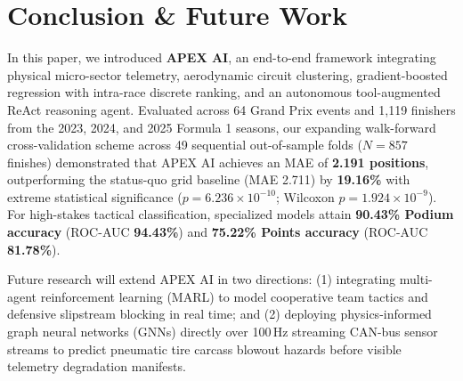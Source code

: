 \documentclass[journal]{IEEEtran}
\begin{document}
\section{Conclusion \& Future Work}
\label{sec:conclusion}
In this paper, we introduced \textbf{APEX AI}, an end-to-end framework integrating physical micro-sector telemetry, aerodynamic circuit clustering, gradient-boosted regression with intra-race discrete ranking, and an autonomous tool-augmented ReAct reasoning agent. Evaluated across 64 Grand Prix events and 1,119 finishers from the 2023, 2024, and 2025 Formula 1 seasons, our expanding walk-forward cross-validation scheme across 49 sequential out-of-sample folds ($N = 857$ finishes) demonstrated that APEX AI achieves an MAE of \textbf{2.191 positions}, outperforming the status-quo grid baseline (MAE 2.711) by \textbf{19.16\%} with extreme statistical significance ($p = 6.236 \times 10^{-10}$; Wilcoxon $p = 1.924 \times 10^{-9}$). For high-stakes tactical classification, specialized models attain \textbf{90.43\% Podium accuracy} (ROC-AUC \textbf{94.43\%}) and \textbf{75.22\% Points accuracy} (ROC-AUC \textbf{81.78\%}).

Future research will extend APEX AI in two directions: (1) integrating multi-agent reinforcement learning (MARL) to model cooperative team tactics and defensive slipstream blocking in real time; and (2) deploying physics-informed graph neural networks (GNNs) directly over 100\,Hz streaming CAN-bus sensor streams to predict pneumatic tire carcass blowout hazards before visible telemetry degradation manifests.

\balance


\end{document}
